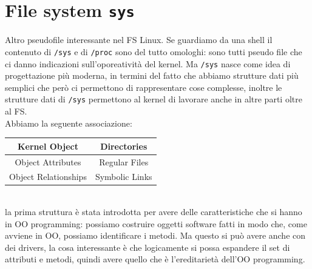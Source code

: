 \documentclass[12pt, oneside]{extbook}
\begin{document}
\section{File system \texttt{sys}}
Altro pseudofile interessante nel FS Linux. Se guardiamo da una shell il contenuto di \texttt{/sys} e di \texttt{/proc} sono del tutto omologhi: sono tutti pseudo file che ci danno indicazioni sull'oporeatività del kernel. Ma \texttt{/sys} nasce come idea di progettazione più moderna, in termini del fatto che abbiamo strutture dati più semplici che però ci permettono di rappresentare cose complesse, inoltre le strutture dati di \texttt{/sys} permettono al kernel di lavorare anche in altre parti oltre al FS.\\Abbiamo la seguente associazione:
\begin{table}[!h]
	\begin{tabular}{|c | c|}
		\hline
		Kernel Object & Directories\\
		\hline
		Object Attributes & Regular Files\\
		\hline
		Object Relationships & Symbolic Links\\
		\hline
	\end{tabular}
\end{table}
\\la prima struttura è stata introdotta per avere delle caratteristiche che si hanno in OO programming: possiamo costruire oggetti software fatti in modo che, come avviene in OO, possiamo identificare i metodi. Ma questo si può avere anche con dei drivers, la cosa interessante è che logicamente si possa espandere il set di attributi e metodi, quindi avere quello che è l'ereditarietà dell'OO programming.
\end{document}
